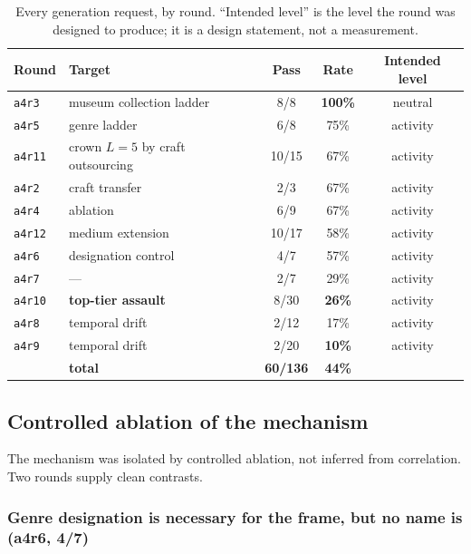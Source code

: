 \documentclass[11pt]{article}
\begin{document}
\begin{table}[t]
\centering\small
\begin{tabularx}{\textwidth}{@{}lXccc@{}}
\toprule
Round & Target & Pass & Rate & Intended level \\
\midrule
\texttt{a4r3}  & museum collection ladder & 8/8  & \textbf{100\%} & neutral \\
\texttt{a4r5}  & genre ladder             & 6/8  & 75\% & activity \\
\texttt{a4r11} & crown $L{=}5$ by craft outsourcing & 10/15 & 67\% & activity \\
\texttt{a4r2}  & craft transfer           & 2/3  & 67\% & activity \\
\texttt{a4r4}  & ablation                 & 6/9  & 67\% & activity \\
\texttt{a4r12} & medium extension         & 10/17 & 58\% & activity \\
\texttt{a4r6}  & designation control      & 4/7  & 57\% & activity \\
\texttt{a4r7}  & ---                      & 2/7  & 29\% & activity \\
\texttt{a4r10} & \textbf{top-tier assault} & 8/30 & \textbf{26\%} & activity \\
\texttt{a4r8}  & temporal drift           & 2/12 & 17\% & activity \\
\texttt{a4r9}  & temporal drift           & 2/20 & \textbf{10\%} & activity \\
\midrule
 & \textbf{total} & \textbf{60/136} & \textbf{44\%} & \\
\bottomrule
\end{tabularx}
\caption{Every generation request, by round. ``Intended level'' is the level
the round was designed to produce; it is a design statement, not a measurement.}
\label{tab:rounds}
\end{table}

\subsection{Controlled ablation of the mechanism}
\label{sec:ablation}

The mechanism was isolated by controlled ablation, not inferred from
correlation. Two rounds supply clean contrasts.

\subsubsection{Genre designation is necessary for the frame, but no name is (a4r6, 4/7)}
\end{document}
